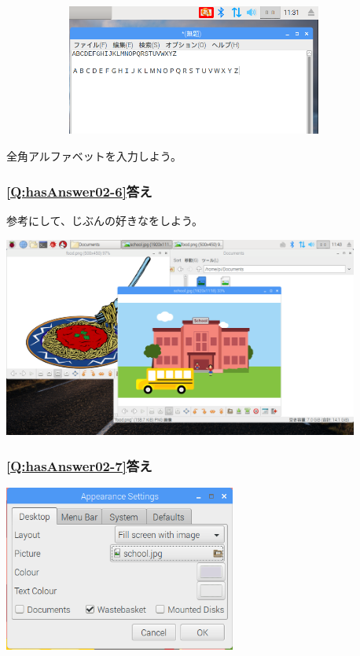 \documentclass[a4paper,12pt]{jarticle}
\begin{document}
\bigskip

\bigskip


\centering
\includegraphics[width=12.631cm,height=4.297cm]{textbook-img220.png}
\flushleft

\bigskip

全角アルファベットを入力しよう。
\clearpage

\subsubsection{\bfseries
\ref*{Q:hasAnswer02-6}答え}

参考にして、じぶんの好きなをしよう。

\centering
\includegraphics[width=11.705cm,height=6.581cm]{textbook-img221.png}
\flushleft

\bigskip


\subsubsection{\bfseries
\ref*{Q:hasAnswer02-7}答え}



\centering
\includegraphics[width=7.631cm,height=5.44cm]{textbook-img222.png}
\end{document}
